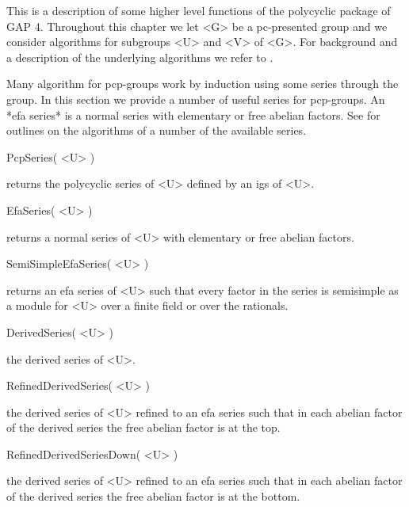 

This is a description of some higher level functions of the {\sf polycyclic}
package of GAP 4. Throughout this chapter we let <G> be a pc-presented group 
and we consider algorithms for subgroups <U> and <V> of <G>. For background
and a description of the underlying algorithms we refer to \cite{Eic01b}.


Many  algorithm for  pcp-groups work  by induction  using  some series
through  the group.  In this  section we  provide a  number  of useful
series  for pcp-groups.   An  *efa  series* is  a  normal series  with
elementary or free abelian  factors.  See \cite{Eic00} for outlines on
the algorithms of a number of the available series.

\>PcpSeries( <U> )

returns the polycyclic series of <U> defined by an igs of <U>.

\>EfaSeries( <U> )

returns a normal series of <U> with elementary or free abelian factors.

\> SemiSimpleEfaSeries( <U> )

returns an efa series of <U> such that every factor in the series is
semisimple as a module for <U> over a finite field or over the rationals.

\>DerivedSeries( <U> )

the derived series of <U>.

\>RefinedDerivedSeries( <U> )

the  derived series of <U> refined  to an efa series such that
in each abelian factor of the  derived series the free abelian
factor is at the top.

\>RefinedDerivedSeriesDown( <U> )

the  derived series of <U> refined  to an efa series such that
in each abelian factor of  the derived series the free abelian
factor is at the bottom.

